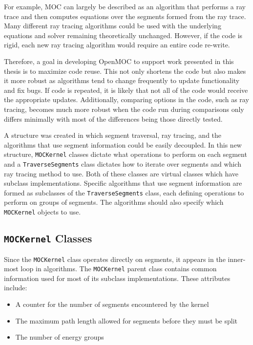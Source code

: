 For example, \ac{MOC} can largely be described as an algorithm that performs a ray trace and then computes equations over the segments formed from the ray trace. Many different ray tracing algorithms could be used with the underlying equations and solver remaining theoretically unchanged. However, if the code is rigid, each new ray tracing algorithm would require an entire code re-write.

Therefore, a goal in developing OpenMOC to support work presented in this thesis is to maximize code reuse. This not only shortens the code but also makes it more robust as algorithms tend to change frequently to update functionality and fix bugs. If code is repeated, it is likely that not all of the code would receive the appropriate updates. Additionally, comparing options in the code, such as ray tracing, becomes much more robust when the code run during comparisons only differs minimally with most of the differences being those directly tested.

A structure was created in which segment traversal, ray tracing, and the algorithms that use segment information could be easily decoupled. In this new structure, \texttt{MOCKernel} classes dictate what operations to perform on each segment and a \texttt{TraverseSegments} class dictates how to iterate over segments and which ray tracing method to use. Both of these classes are virtual classes which have subclass implementations. Specific algorithms that use segment information are formed as subclasses of the \texttt{TraverseSegments} class, each defining operations to perform on groups of segments. The algorithms should also specify which \texttt{MOCKernel} objects to use.

\subsection{\texttt{MOCKernel} Classes}

Since the \texttt{MOCKernel} class operates directly on segments, it appears in the inner-most loop in algorithms. The \texttt{MOCKernel} parent class contains common information used for most of its subclass implementations. These attributes include:
\begin{itemize}
	\item A counter for the number of segments encountered by the kernel
	\item The maximum path length allowed for segments before they must be split
	\item The number of energy groups
\end{itemize}

